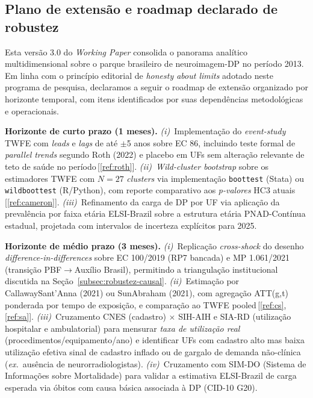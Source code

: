 \documentclass[12pt,a4paper,oneside]{article}
\begin{document}
\subsection{Plano de extensão e roadmap declarado de
robustez}\label{subsec:roadmap}

Esta versão 3.0 do \textit{Working Paper} consolida o panorama
analítico multidimensional sobre o parque brasileiro de
neuroimagem-DP no período 2013. Em linha com o
princípio editorial de \textit{honesty about limits} adotado
neste programa de pesquisa, declaramos a seguir o roadmap de
extensão organizado por horizonte temporal, com itens
identificados por suas dependências metodológicas e operacionais.

\textbf{Horizonte de curto prazo (1 meses).}
\textit{(i)}~Implementação do \textit{event-study} TWFE com
\textit{leads} e \textit{lags} de até $\pm$5 anos sobre EC 86,
incluindo teste formal de \textit{parallel trends} segundo Roth
(2022) e placebo em UFs sem alteração relevante de teto de saúde
no período\,[\ref{ref:roth}]. \textit{(ii)}~\textit{Wild-cluster
bootstrap} sobre os estimadores TWFE com $N=27$
\textit{clusters} via implementação \texttt{boottest}
(Stata) ou \texttt{wildboottest} (R/Python), com reporte
comparativo aos \textit{p-valores} HC3 atuais\,[\ref{ref:cameron}].
\textit{(iii)}~Refinamento da carga de DP por UF via aplicação
da prevalência por faixa etária ELSI-Brazil sobre a estrutura
etária PNAD-Contínua estadual, projetada com intervalos de
incerteza explícitos para 2025.

\textbf{Horizonte de médio prazo (3 meses).}
\textit{(i)}~Replicação \textit{cross-shock} do desenho
\textit{difference-in-differences} sobre EC 100/2019 (RP7
bancada) e MP 1.061/2021 (transição PBF$\to$Auxílio Brasil),
permitindo a triangulação institucional discutida na
Seção~\ref{subsec:robustez-causal}. \textit{(ii)}~Estimação por
Callaway\textendash Sant'Anna (2021) ou Sun\textendash Abraham
(2021), com agregação ATT(g,t) ponderada por tempo de exposição,
e comparação ao TWFE pooled\,[\ref{ref:cs}, \ref{ref:sa}].
\textit{(iii)}~Cruzamento CNES (cadastro) $\times$ SIH-AIH e
SIA-RD (utilização hospitalar e ambulatorial) para mensurar
\textit{taxa de utilização real} (procedimentos/equipamento/ano)
e identificar UFs com cadastro alto mas baixa utilização efetiva
\textemdash{} sinal de cadastro inflado ou de gargalo de demanda
não-clínica (\textit{ex.}~ausência de neurorradiologistas).
\textit{(iv)}~Cruzamento com SIM-DO (Sistema de Informações
sobre Mortalidade) para validar a estimativa ELSI-Brazil de
carga esperada via óbitos com causa básica associada à DP
(CID-10 G20).
\end{document}
